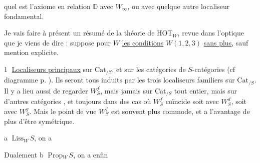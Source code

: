 quel est l'axiome  en relation  
$\mathbb{D}$ avec $W_\infty$, ou avec quelque autre localiseur
fondamental.

Je vais faire à présent un résumé de la
théorie de $\mathrm{HOT}_W$, revue dans l'optique que je
viens de dire :  suppose pour $W$ \uline{les conditions}
$W(1,2,3)$ \uline{sans plus}, sauf mention explicite.

\textcircled{1} \uline{Localiseurs principaux} sur $\mathrm{Cat}_{/S}$, et sur les
 catégories  de $S$-catégories (cf diagramme p. ). Ils seront tous induits par les trois
localiseurs familiers
sur $\mathrm{Cat}_{/S}$.  Il y a lieu aussi de
regarder $W_S^f$, mais jamais sur $\mathrm{Cat}_{/S}$ tout entier,
mais sur d'autres catégories , et
toujours dans des cas où $W_S^f$ coïncide soit avec
$W_S^d$, soit avec $W_S^g$. Mais le point de vue $W_S^f$ est
souvent plus  commode, et a l'avantage de
plus d'être symétrique.

\textcircled{a}  \uline{$\mathrm{Liss}$}$_W\,S$, on a

Dualement  \textcircled{b}  \uline{$\mathrm{Prop}$}$_W\,S$, on a
enfin

